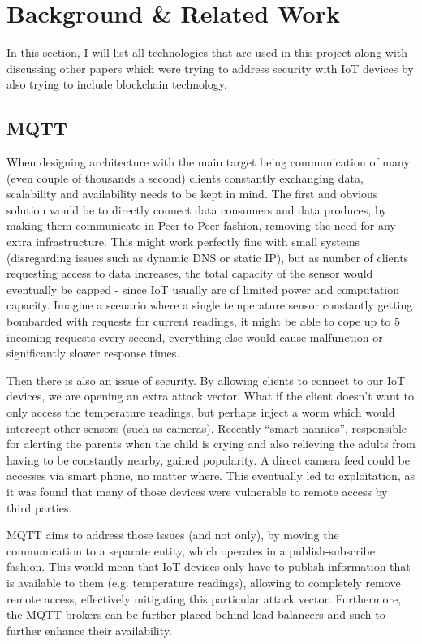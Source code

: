 \chapter{Background \& Related Work}
In this section, I will list all technologies that are used in this project along with discussing other papers which were trying to address security with IoT devices by also trying to include blockchain technology.
\section{MQTT}
When designing architecture with the main target being communication of many (even couple of thousands a second) clients constantly exchanging data, scalability and availability needs to be kept in mind. The first and obvious solution would be to directly connect data consumers and data produces, by making them communicate in Peer-to-Peer fashion, removing the need for any extra infrastructure. This might work perfectly fine with small systems (disregarding issues such as dynamic DNS or static IP), but as number of clients requesting access to data increases, the total capacity of the sensor would eventually be capped - since IoT usually are of limited power and computation capacity. Imagine a scenario where a single temperature sensor constantly getting bombarded with requests for current readings, it might be able to cope up to 5 incoming requests every second, everything else would cause malfunction or significantly slower response times.

Then there is also an issue of security. By allowing clients to connect to our IoT devices, we are opening an extra attack vector. What if the client doesn't want to only access the temperature readings, but perhaps inject a worm which would intercept other sensors (such as cameras). Recently ``smart nannies'', responsible for alerting the parents when the child is crying and also relieving the adults from having to be constantly nearby, gained popularity. A direct camera feed could be accesses via smart phone, no matter where. This eventually led to exploitation, as it was found that many of those devices were vulnerable to remote access by third parties\cite{pultarova2016webcam}.

MQTT aims to address those issues (and not only), by moving the communication to a separate entity, which operates in a publish-subscribe fashion. This would mean that IoT devices only have to publish information that is available to them (e.g. temperature readings), allowing to completely remove remote access, effectively mitigating this particular attack vector. Furthermore, the MQTT brokers can be further placed behind load balancers and such to further enhance their availability.

